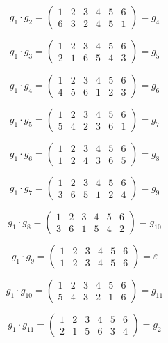 \documentclass[utf8,14pt,a4paper,oneside,russian]{book}
\begin{document}
	\[ g_{1}\cdot g_{2} = \left( 
	\begin{array}{cccccc}
	1&2&3&4&5&6\\
	6&3&2&4&5&1
	\end{array} 
	\right) = g_{4} \]
	
	\[ g_{1}\cdot g_{3} = \left( 
	\begin{array}{cccccc}
	1&2&3&4&5&6\\
	2&1&6&5&4&3
	\end{array} 
	\right) = g_{5} \]
	
	\[ g_{1}\cdot g_{4} = \left( 
	\begin{array}{cccccc}
	1&2&3&4&5&6\\
	4&5&6&1&2&3
	\end{array} 
	\right) = g_{6} \]
	
	\[ g_{1}\cdot g_{5} = \left( 
	\begin{array}{cccccc}
	1&2&3&4&5&6\\
	5&4&2&3&6&1
	\end{array} 
	\right) = g_{7} \]
	
	\[ g_{1}\cdot g_{6} = \left( 
	\begin{array}{cccccc}
	1&2&3&4&5&6\\
	1&2&4&3&6&5
	\end{array} 
	\right) = g_{8} \]
	
	\[ g_{1}\cdot g_{7} = \left( 
	\begin{array}{cccccc}
	1&2&3&4&5&6\\
	3&6&5&1&2&4
	\end{array} 
	\right) = g_{9} \]
	
	\[ g_{1}\cdot g_{8} = \left( 
	\begin{array}{cccccc}
	1&2&3&4&5&6\\
	3&6&1&5&4&2
	\end{array} 
	\right) = g_{10} \]
	
	\[ g_{1}\cdot g_{9} = \left( 
	\begin{array}{cccccc}
	1&2&3&4&5&6\\
	1&2&3&4&5&6
	\end{array} 
	\right) = \varepsilon \]
	
	\[ g_{1}\cdot g_{10} = \left( 
	\begin{array}{cccccc}
	1&2&3&4&5&6\\
	5&4&3&2&1&6
	\end{array} 
	\right) = g_{11} \]
	
	\[ g_{1}\cdot g_{11} = \left( 
	\begin{array}{cccccc}
	1&2&3&4&5&6\\
	2&1&5&6&3&4
	\end{array} 
	\right) = g_{2} \]
	
\end{document}
